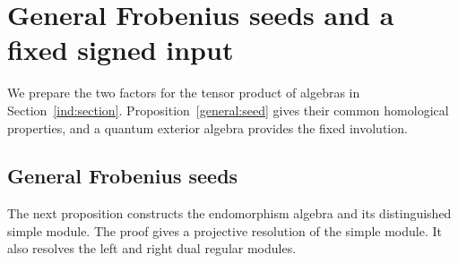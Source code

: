 \documentclass[11pt]{article}
\begin{document}
\section{General Frobenius seeds and a fixed signed input}
\label{seed:section}

We prepare the two factors for the tensor product of algebras in
Section~\ref{ind:section}. Proposition~\ref{general:seed} gives their
common homological properties, and a quantum exterior algebra provides
the fixed involution.

\subsection{General Frobenius seeds}

The next proposition constructs the endomorphism algebra and its
distinguished simple module. The proof gives a projective resolution
of the simple module. It also resolves the left and right dual regular modules.
\end{document}

